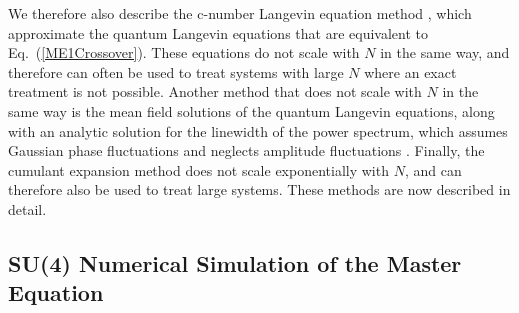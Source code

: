 \documentclass[aps,prl,twocolumn,
superscriptaddress,groupedaddress]{revtex4}
\begin{document}
We therefore also describe the c-number Langevin equation method
\cite{Scully97, PhysRevA.47.1431}, which approximate the quantum
Langevin equations that are equivalent to Eq.~(\ref{ME1Crossover}).
These equations do not scale with $N$ in the same way, and therefore can
often be used to treat systems with large $N$ where an exact treatment
is not possible. Another method that does not scale with $N$ in the same
way is the mean field solutions of the quantum Langevin equations, along
with an analytic solution for the linewidth of the power spectrum, which
assumes Gaussian phase fluctuations and neglects amplitude fluctuations
\cite{HakenLaser, HakenLaserBook}. Finally, the cumulant expansion
method \cite{JPSJ.17.1100} does not scale exponentially with $N$, and
can therefore also be used to treat large systems. These methods are now
described in detail.


\subsection{SU(4) Numerical Simulation of the Master Equation}
\end{document}
